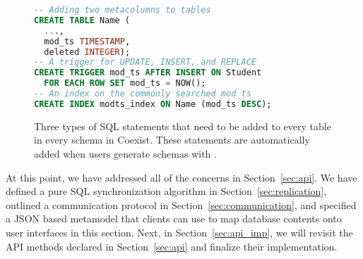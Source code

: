 \begin{figure}[h!]
\begin{lstlisting}[language=SQL]
-- Adding two metacolumns to tables
CREATE TABLE Name (
  ...,
  mod_ts TIMESTAMP,
  deleted INTEGER);
-- A trigger for UPDATE, INSERT, and REPLACE
CREATE TRIGGER mod_ts AFTER INSERT ON Student
  FOR EACH ROW SET mod_ts = NOW();
-- An index on the commonly searched mod_ts
CREATE INDEX modts_index ON Name (mod_ts DESC);

\end{lstlisting}
\caption{Three types of SQL statements that need to be added to every table in
every schema in Coexist. These statements are automatically added when  users
generate schemas with .}
\label{fig:modelgen_save}
\end{figure}


At this point, we have addressed all of the concerns in Section~\ref{sec:api}.
We have defined a pure SQL synchronization algorithm in
Section~\ref{sec:replication}, outlined a communication protocol in
Section~\ref{sec:communication}, and specified a JSON based metamodel that
clients can use to map database contents onto user interfaces in this section.
Next, in Section~\ref{sec:api_imp}, we will revisit the API methods declared in
Section~\ref{sec:api} and finalize their implementation. 




